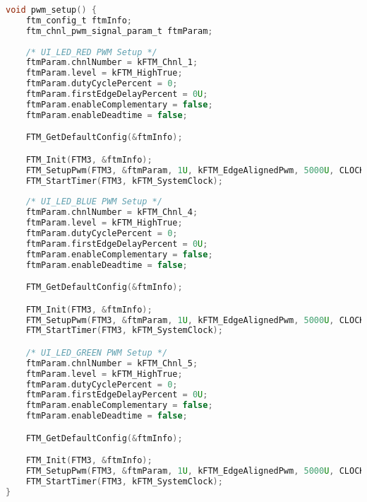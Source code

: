 \begin{lstlisting}[language=c,caption=Problem 5 FTM/PWM Setup, label=list:p5_ftm]
void pwm_setup() {
    ftm_config_t ftmInfo;
    ftm_chnl_pwm_signal_param_t ftmParam;
    
    /* UI_LED_RED PWM Setup */
    ftmParam.chnlNumber = kFTM_Chnl_1;
    ftmParam.level = kFTM_HighTrue;
    ftmParam.dutyCyclePercent = 0;
    ftmParam.firstEdgeDelayPercent = 0U;
    ftmParam.enableComplementary = false;
    ftmParam.enableDeadtime = false;

    FTM_GetDefaultConfig(&ftmInfo);

    FTM_Init(FTM3, &ftmInfo);
    FTM_SetupPwm(FTM3, &ftmParam, 1U, kFTM_EdgeAlignedPwm, 5000U, CLOCK_GetFreq(kCLOCK_BusClk));
    FTM_StartTimer(FTM3, kFTM_SystemClock);
    
    /* UI_LED_BLUE PWM Setup */
    ftmParam.chnlNumber = kFTM_Chnl_4;
    ftmParam.level = kFTM_HighTrue;
    ftmParam.dutyCyclePercent = 0;
    ftmParam.firstEdgeDelayPercent = 0U;
    ftmParam.enableComplementary = false;
    ftmParam.enableDeadtime = false;

    FTM_GetDefaultConfig(&ftmInfo);

    FTM_Init(FTM3, &ftmInfo);
    FTM_SetupPwm(FTM3, &ftmParam, 1U, kFTM_EdgeAlignedPwm, 5000U, CLOCK_GetFreq(kCLOCK_BusClk));
    FTM_StartTimer(FTM3, kFTM_SystemClock);

    /* UI_LED_GREEN PWM Setup */
    ftmParam.chnlNumber = kFTM_Chnl_5;
    ftmParam.level = kFTM_HighTrue;
    ftmParam.dutyCyclePercent = 0;
    ftmParam.firstEdgeDelayPercent = 0U;
    ftmParam.enableComplementary = false;
    ftmParam.enableDeadtime = false;

    FTM_GetDefaultConfig(&ftmInfo);

    FTM_Init(FTM3, &ftmInfo);
    FTM_SetupPwm(FTM3, &ftmParam, 1U, kFTM_EdgeAlignedPwm, 5000U, CLOCK_GetFreq(kCLOCK_BusClk));
    FTM_StartTimer(FTM3, kFTM_SystemClock);
}
\end{lstlisting}
